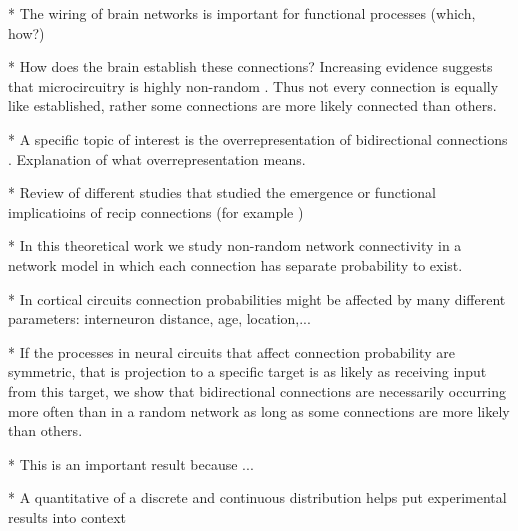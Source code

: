 
* The wiring of brain networks is important for functional processes (which, how?)

* How does the brain establish these connections? Increasing evidence suggests that microcircuitry is highly non-random \cite{Song2005,Perin2011}. Thus not every connection is equally like established, rather some connections are more likely connected than others.

* A specific topic of interest is the overrepresentation of bidirectional connections \cite{Markram1997,Song2005}. Explanation of what overrepresentation means.

* Review of different studies that studied the emergence or functional implicatioins of recip connections (for example \cite{Clopath2010})

* In this theoretical work we study non-random network connectivity in a network model in which each connection has separate probability to exist.

* In cortical circuits connection probabilities might be affected by many different parameters: interneuron distance, age, location,...

* If the processes in neural circuits that affect connection probability are symmetric, that is projection to a specific target is as likely as receiving input from this target, we show that bidirectional connections are necessarily occurring more often than in a random network as long as some connections are more likely than others.

* This is an important result because ...

* A quantitative of a discrete and continuous distribution helps put experimental results into context



